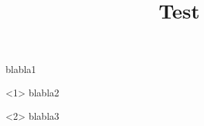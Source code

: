 \documentclass[compress,8pt]{beamer}
\title{Test}
\begin{document}
\begin{frame}
    blabla1
\end{frame}

\begin{frame}
    \begin{onlyenv}<1>
        blabla2
    \end{onlyenv}
    \begin{onlyenv}<2>
        blabla3
    \end{onlyenv}
\end{frame}
\end{document}
